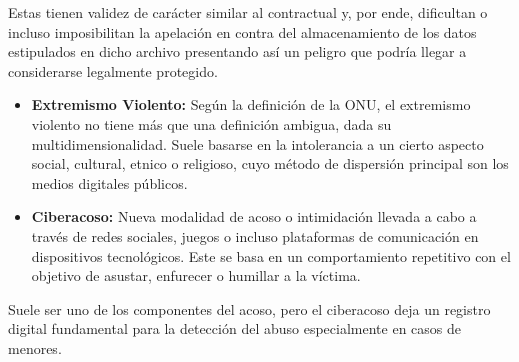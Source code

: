 Estas tienen validez de carácter similar al contractual y, por ende, dificultan o incluso imposibilitan la apelación en contra del almacenamiento de los datos estipulados en dicho archivo presentando así un peligro que podría llegar a considerarse legalmente protegido.

\begin{itemize}
  \item \textbf{Extremismo Violento:} Según la definición de la ONU, el extremismo violento no tiene más que una definición ambigua, dada su multidimensionalidad. Suele basarse en la intolerancia a un cierto aspecto social, cultural, etnico o religioso, cuyo método de dispersión principal son los medios digitales públicos.
  \item \textbf{Ciberacoso:} Nueva modalidad de acoso o intimidación llevada a cabo a través de redes sociales, juegos o incluso plataformas de comunicación en dispositivos tecnológicos. Este se basa en un comportamiento repetitivo con el objetivo de asustar, enfurecer o humillar a la víctima.
\end{itemize}

Suele ser uno de los componentes del acoso, pero el ciberacoso deja un registro digital fundamental para la detección del abuso especialmente en casos de menores.

